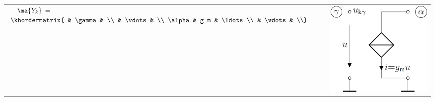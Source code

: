 \documentclass[fs, footer]{latex4ei}
\begin{document}
\begin{multicols*}{4}
\begin{tabular}{ll}
        $\ \ \ \ \ma {Y_k}$ =
        $\kbordermatrix{ & \gamma &                                                                                                                                                                                                                                                                           \\
                         & \vdots &                                                                                                                                                                                                                                                                           \\
        \alpha           & g_m    & \ldots                                                                                                                                                                                                                                                                    \\
                         & \vdots & \\}$ & \hspace{-2em}\parbox{3cm}{\includegraphics[scale=0.15]{./img/nodevoltageanalysis/vccs_a_y_gnd.png} }                                                                                                                                         \\
    \end{tabular}\\
    \normalsize

\end{multicols*}
\end{document}
